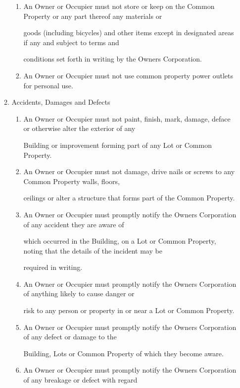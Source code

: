 \documentclass{article}
\begin{document}
\begin{enumerate}[label=\arabic*.]
\begin{enumerate}[label=\arabic{enumi}.\arabic*.]
\begin{enumerate}[label=(\arabic*)]
\item  An Owner or Occupier must not store or keep on the Common Property or any part thereof any materials or 

goods (including bicycles) and other items except in designated areas if any and subject to terms and 

conditions set forth in writing by the Owners Corporation. 

\item  An Owner or Occupier must not use common property power outlets for personal use. 

\end{enumerate}
\item  Accidents, Damages and Defects 

\begin{enumerate}[label=(\arabic*)]
\item  An Owner or Occupier must not paint, finish, mark, damage, deface or otherwise alter the exterior of any 

Building or improvement forming part of any Lot or Common Property. 

\item  An Owner or Occupier must not damage, drive nails or screws to any Common Property walls, floors, 

ceilings or alter a structure that forms part of the Common Property. 

\newpage

\item  An Owner or Occupier must promptly notify the Owners Corporation of any accident they are aware of 

which occurred in the Building, on a Lot or Common Property, noting that the details of the incident may be 

required in writing. 

\item  An Owner or Occupier must promptly notify the Owners Corporation of anything likely to cause danger or 

risk to any person or property in or near a Lot or Common Property. 

\item  An Owner or Occupier must promptly notify the Owners Corporation of any defect or damage to the 

Building, Lots or Common Property of which they become aware. 

\item  An Owner or Occupier must promptly notify the Owners Corporation of any breakage or defect with regard 


\end{enumerate}
\end{enumerate}
\end{enumerate}
\end{document}
